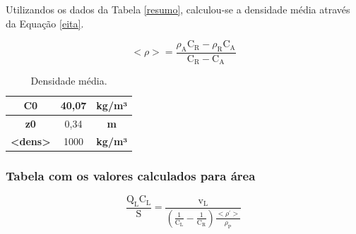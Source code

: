 Utilizandos os dados da Tabela \ref{resumo}, calculou-se a densidade média através da Equação \ref{eita}.

\begin{equation}\label{eita}
<\rho>=\frac{\rho_{\mathrm{A}} \mathrm{C}_{\mathrm{R}}-\rho_{\mathrm{R}} \mathrm{C}_{\mathrm{A}}}{\mathrm{C}_{\mathrm{R}}-\mathrm{C}_{\mathrm{A}}}
\end{equation}


\begin{table}[H]
	\centering
	\begin{tabular}{|c|c|c|}
		\hline
		\textbf{C0} & 40,07 & \textbf{kg/m³} \\ \hline
		\textbf{z0} & 0,34 & \textbf{m} \\ \hline
		\textbf{\textless{}dens\textgreater{}} & 1000 & \textbf{kg/m³} \\ \hline
	\end{tabular}
	\caption{Densidade média.}
	\label{rhomedio}
\end{table}



\subsubsection{Tabela com os valores calculados para área}

\begin{equation}\label{key}
\frac{\mathrm{Q}_{\mathrm{L}} \mathrm{C}_{\mathrm{L}}}{\mathrm{S}}=\frac{\mathrm{v}_{\mathrm{L}}}{\left(\frac{1}{\mathrm{C}_{\mathrm{L}}}-\frac{1}{\mathrm{C}_{\mathrm{R}}}\right) \frac{<\rho^{\prime}>}{\rho_{\mathrm{P}}}}
\end{equation}


